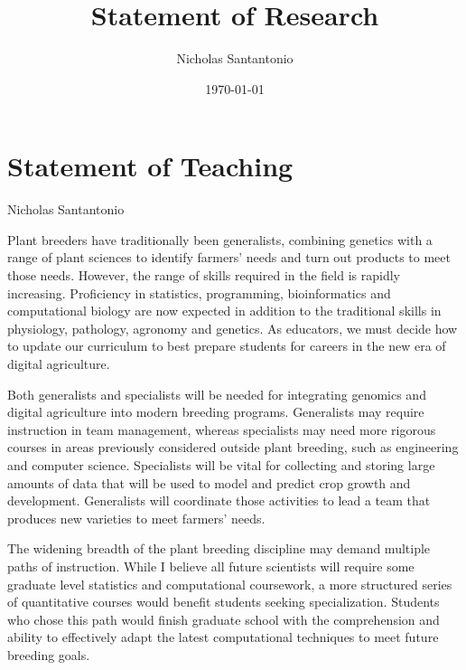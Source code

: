 \documentclass[11pt]{article}
\title{Statement of Research}
\author{Nicholas Santantonio}
\date{\today}
\begin{document}
\section*{\centering Statement of Teaching}
\begin{center} Nicholas Santantonio \end{center}

\noindent Plant breeders have traditionally been generalists, combining genetics with a range of plant sciences to identify farmers' needs and turn out products to meet those needs. However, the range of skills required in the field is rapidly increasing. Proficiency in statistics, programming, bioinformatics and computational biology are now expected in addition to the traditional skills in physiology, pathology, agronomy and genetics. As educators, we must decide how to update our curriculum to best prepare students for careers in the new era of digital agriculture. 


Both generalists and specialists will be needed for integrating genomics and digital agriculture into modern breeding programs. Generalists may require instruction in team management, whereas specialists may need more rigorous courses in areas previously considered outside plant breeding, such as engineering and computer science. Specialists will be vital for collecting and storing large amounts of data that will be used to model and predict crop growth and development. Generalists will coordinate those activities to lead a team that produces new varieties to meet farmers' needs. 


The widening breadth of the plant breeding discipline may demand multiple paths of instruction. While I believe all future scientists will require some graduate level statistics and computational coursework, a more structured series of quantitative courses would benefit students seeking specialization. Students who chose this path would finish graduate school with the comprehension and ability to effectively adapt the latest computational techniques to meet future breeding goals.%
\end{document}
